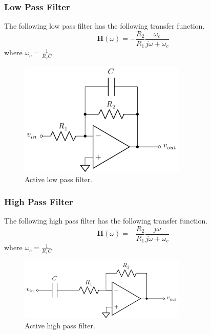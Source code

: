 \documentclass{article}
\begin{document}
\subsubsection{Low Pass Filter}
The following low pass filter has the following transfer function.
\begin{equation*}
    \symbf{H}(\omega) = -\frac{R_2}{R_1}\frac{\omega_c}{j\omega + \omega_c}
\end{equation*}
where \(\displaystyle \omega_c = \frac{1}{R_2C}\).
\begin{figure}[H]
    \centering
    \includegraphics[width = 8cm, keepaspectratio = true]{figures/active_low_pass_filter.pdf}
    \caption{Active low pass filter.}
\end{figure}
\subsubsection{High Pass Filter}
The following high pass filter has the following transfer function.
\begin{equation*}
    \symbf{H}(\omega) = -\frac{R_2}{R_1}\frac{j\omega}{j\omega + \omega_c}
\end{equation*}
where \(\displaystyle \omega_c = \frac{1}{R_1C}\).
\begin{figure}[H]
    \centering
    \includegraphics[width = 8cm, keepaspectratio = true]{figures/active_high_pass_filter.pdf}
    \caption{Active high pass filter.}
\end{figure}
\end{document}
